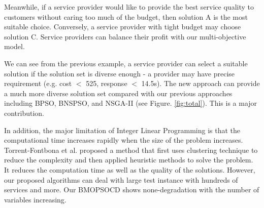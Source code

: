 \documentclass[10pt,journal,compsoc]{IEEEtran}
\begin{document}
Meanwhile, if a service provider would like to provide the best service quality to customers without caring too much of the budget, then solution A is the most suitable choice. Conversely, a service provider with tight budget may choose solution C. 
Service providers can balance their profit with our multi-objective model.

We can see from the previous example, a service provider can select a suitable solution if the solution set is diverse enough - a provider may have precise requirement (e.g. cost $<$ 525, response $<$ 14.5s). The new approach can provide a much more diverse solution set compared with our
previous approaches including BPSO, BNSPSO, and NSGA-II (see Figure. \ref{fig:total}). This is a major contribution.

In addition, the major limitation of Integer Linear Programming is that the computational time increases rapidly when the size of the problem increases. Torrent-Fontbona et al. \cite{TorrentFontbona20134593} proposed a method that first uses clustering technique to reduce the complexity and then applied heuristic methods to solve the problem. It reduces the computation time as well as the quality of the solutions. However, our proposed algorithms can deal with large
test instance with hundreds of services and more. Our BMOPSOCD shows none-degradation with the number of variables increasing.




\end{document}
